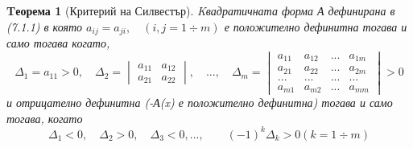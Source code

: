 \documentclass[a4paper,fleqn,12pt]{article}
\newtheorem{theorem}{Tеорема}[subsection]
\theoremstyle{definition}
\begin{document}
\begin{theorem}[Критерий на Силвестър]
Kвадратичната форма А дефинирана в (7.1.1) в която $a_{ij} = a_{ji}, \quad (i,j = 1 \div m)$ е положително дефинитна тогава и само тогава когато,
$$\Delta_1 = a_{11} > 0, \quad  
\Delta_2 =
\begin{vmatrix}
 a_{11} &  a_{12} \\ 
 a_{21} &  a_{22} 
\end{vmatrix}, \quad 
..., \quad
\Delta_m =  
\begin{vmatrix} 
a_{11} &  a_{12} & ... & a_{1m} \\ 
a_{21} &  a_{22} & ... & a_{2m} \\
... & ... & ... & ... \\
a_{m1} &  a_{m2} & ... & a_{mm}
\end{vmatrix} >0
$$
и отрицателно дефинитна (-А(x) е положително дефинитна) тогава и само тогава, когато
$$\Delta_1 <0, \quad \Delta_2 >0, \quad \Delta_3 < 0, ..., \qquad (-1)^k \Delta_k >0 (k = 1 \div m)$$
\end{theorem}
\end{document}
